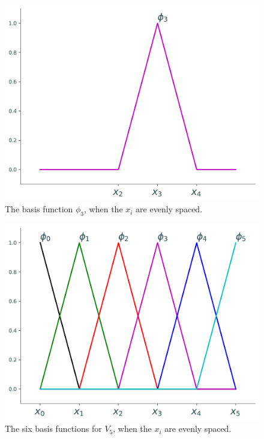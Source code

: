 \begin{figure}[ht]
\centering
\includegraphics[width=\textwidth]{figures/one_basis_function.pdf}
\caption{The basis function $\phi_3$, when the \(x_i\) are evenly spaced.}
\label{fig:FEM_one_basis_function}
\end{figure}

\begin{figure}[ht]
\centering
\includegraphics[width=\textwidth]{figures/basis_functions.pdf}
\caption{The six basis functions for $V_5$, when the \(x_i\) are evenly spaced.}
\label{fig:FEM_basis_functions}
\end{figure}


